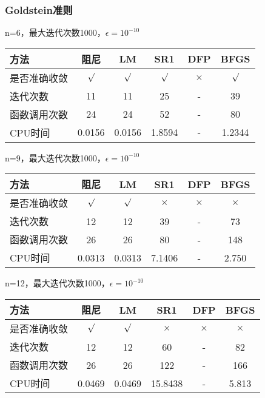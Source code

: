 \documentclass[11pt, a4paper]{article}
\begin{document}
\subsubsection{Goldstein准则}

n=6，最大迭代次数1000，$\epsilon=10^{-10}$

\vspace{10pt}
\begin{tabular}{|l|c|c|c|c|c|}
	\hline
	方法 & 阻尼 & LM & SR1 & DFP & BFGS \\\hline
	是否准确收敛 & $\surd$ & $\surd$ & $\surd$ & $\times$ & $\surd$ \\\hline
	迭代次数 & 11 & 11 & 25 & - & 39 \\\hline
	函数调用次数 & 24 & 24 & 52 & - & 80 \\\hline
	CPU时间 & 0.0156 & 0.0156 & 1.8594 & - & 1.2344\\\hline
\end{tabular}

\vspace{20pt}
n=9，最大迭代次数1000，$\epsilon=10^{-10}$

\vspace{10pt}
\begin{tabular}{|l|c|c|c|c|c|}
	\hline
	方法 & 阻尼 & LM & SR1 & DFP & BFGS \\\hline
	是否准确收敛 & $\surd$ & $\surd$ & $\times$ & $\times$ & $\times$ \\\hline
	迭代次数 & 12 & 12 & 39 & - & 73 \\\hline
	函数调用次数 & 26 & 26 & 80 & - & 148 \\\hline
	CPU时间 & 0.0313 & 0.0313 & 7.1406 & - & 2.750\\\hline
\end{tabular}

\vspace{20pt}
n=12，最大迭代次数1000，$\epsilon=10^{-10}$

\vspace{10pt}
\begin{tabular}{|l|c|c|c|c|c|}
	\hline
	方法 & 阻尼 & LM & SR1 & DFP & BFGS \\\hline
	是否准确收敛 & $\surd$ & $\surd$ & $\times$ & $\times$ & $\times$ \\\hline
	迭代次数 & 12 & 12 & 60 & - & 82 \\\hline
	函数调用次数 & 26 & 26 & 122 & - & 166 \\\hline
	CPU时间 & 0.0469 & 0.0469 & 15.8438 & - & 5.813\\\hline
\end{tabular}
\end{document}
